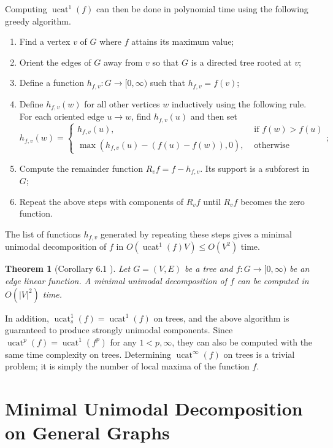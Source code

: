 \documentclass[11pt]{article}
\DeclareMathOperator{\ucat}{ucat}
\newtheorem{thm}{Theorem}[section]
\begin{document}
Computing $\ucat^1(f)$ can then be done in polynomial time using the following greedy algorithm. 

\begin{enumerate}
    \item Find a vertex $v$ of $G$ where $f$ attains its maximum value;
    \item Orient the edges of $G$ away from $v$ so that $G$ is a directed tree rooted at $v$;
    \item Define a function $h_{f,v} : G \rightarrow [0, \infty)$ such that $h_{f,v} = f(v)$;
    \item Define $h_{f,v}(w)$ for all other vertices $w$ inductively using the following rule. For each oriented edge $u \longrightarrow w$, find $h_{f,v}(u)$ and then set
    \[
        h_{f,v}(w) = \begin{cases}
            h_{f,v}(u),& \text{ if $f(w) > f(u)$} \\
            \max(h_{f,v}(u)-(f(u)-f(w)), 0), & \text{ otherwise }
        \end{cases};
    \]
    \item Compute the remainder function $R_v f = f - h_{f,v}$. Its support is a subforest in $G$;
    \item Repeat the above steps with components of $R_v f$ until $R_v f$ becomes the zero function.
\end{enumerate}

The list of functions $h_{f,v}$ generated by repeating these steps gives a minimal unimodal decomposition of $f$ in $O(\ucat^1(f) V) \leq O(V^2)$ time. 

\begin{thm}[Corollary 6.1 \cite{Bar20}]
Let $G=(V,E)$ be a tree and $f : G \rightarrow [0,\infty)$ be an edge linear function. A minimal unimodal decomposition of $f$ can be computed in $O(|V|^2)$ time.
\end{thm}

In addition, $\ucat_s^1(f) = \ucat^1(f)$ on trees, and the above algorithm is guaranteed to produce strongly unimodal components. Since $\ucat^p(f) = \ucat^1(f^p)$ for any $1 < p ,\infty$, they can also be computed with the same time complexity on trees. Determining $\ucat^{\infty}(f)$ on trees is a trivial problem; it is simply the number of local maxima of the function $f$.  

\section{Minimal Unimodal Decomposition on General Graphs}
\end{document}

